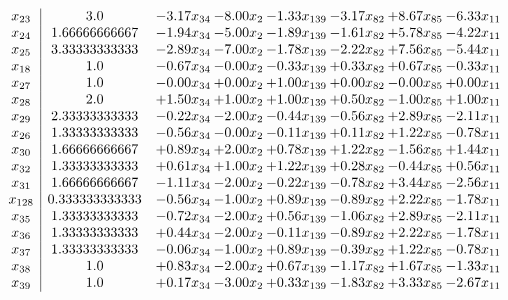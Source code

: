 \documentclass[8pt]{article}
\begin{document}
\[\begin{array}{c| c c@{\hskip 2pt} c@{\hskip 2pt} c@{\hskip 2pt} c@{\hskip 2pt} c@{\hskip 2pt} c@{\hskip 2pt} }
 x_{23}   &  3.0 & -3.17 x_{34} & -8.00 x_{2} & -1.33 x_{139} & -3.17 x_{82} & +  8.67 x_{85} & -6.33 x_{11}\\
 x_{24}   &  1.66666666667 & -1.94 x_{34} & -5.00 x_{2} & -1.89 x_{139} & -1.61 x_{82} & +  5.78 x_{85} & -4.22 x_{11}\\
 x_{25}   &  3.33333333333 & -2.89 x_{34} & -7.00 x_{2} & -1.78 x_{139} & -2.22 x_{82} & +  7.56 x_{85} & -5.44 x_{11}\\
 x_{18}   &  1.0 & -0.67 x_{34} & -0.00 x_{2} & -0.33 x_{139} & +  0.33 x_{82} & +  0.67 x_{85} & -0.33 x_{11}\\
 x_{27}   &  1.0 & -0.00 x_{34} & +  0.00 x_{2} & +  1.00 x_{139} & +  0.00 x_{82} & -0.00 x_{85} & +  0.00 x_{11}\\
 x_{28}   &  2.0 & +  1.50 x_{34} & +  1.00 x_{2} & +  1.00 x_{139} & +  0.50 x_{82} & -1.00 x_{85} & +  1.00 x_{11}\\
 x_{29}   &  2.33333333333 & -0.22 x_{34} & -2.00 x_{2} & -0.44 x_{139} & -0.56 x_{82} & +  2.89 x_{85} & -2.11 x_{11}\\
 x_{26}   &  1.33333333333 & -0.56 x_{34} & -0.00 x_{2} & -0.11 x_{139} & +  0.11 x_{82} & +  1.22 x_{85} & -0.78 x_{11}\\
 x_{30}   &  1.66666666667 & +  0.89 x_{34} & +  2.00 x_{2} & +  0.78 x_{139} & +  1.22 x_{82} & -1.56 x_{85} & +  1.44 x_{11}\\
 x_{32}   &  1.33333333333 & +  0.61 x_{34} & +  1.00 x_{2} & +  1.22 x_{139} & +  0.28 x_{82} & -0.44 x_{85} & +  0.56 x_{11}\\
 x_{31}   &  1.66666666667 & -1.11 x_{34} & -2.00 x_{2} & -0.22 x_{139} & -0.78 x_{82} & +  3.44 x_{85} & -2.56 x_{11}\\
 x_{128}   &  0.333333333333 & -0.56 x_{34} & -1.00 x_{2} & +  0.89 x_{139} & -0.89 x_{82} & +  2.22 x_{85} & -1.78 x_{11}\\
 x_{35}   &  1.33333333333 & -0.72 x_{34} & -2.00 x_{2} & +  0.56 x_{139} & -1.06 x_{82} & +  2.89 x_{85} & -2.11 x_{11}\\
 x_{36}   &  1.33333333333 & +  0.44 x_{34} & -2.00 x_{2} & -0.11 x_{139} & -0.89 x_{82} & +  2.22 x_{85} & -1.78 x_{11}\\
 x_{37}   &  1.33333333333 & -0.06 x_{34} & -1.00 x_{2} & +  0.89 x_{139} & -0.39 x_{82} & +  1.22 x_{85} & -0.78 x_{11}\\
 x_{38}   &  1.0 & +  0.83 x_{34} & -2.00 x_{2} & +  0.67 x_{139} & -1.17 x_{82} & +  1.67 x_{85} & -1.33 x_{11}\\
 x_{39}   &  1.0 & +  0.17 x_{34} & -3.00 x_{2} & +  0.33 x_{139} & -1.83 x_{82} & +  3.33 x_{85} & -2.67 x_{11}\\

\end{array}\]
\end{document}
